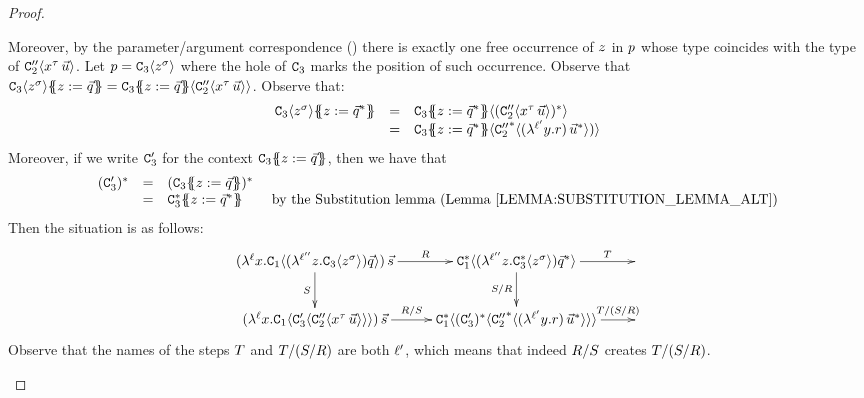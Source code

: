 \begin{proof}
\begin{enumerate}
\begin{enumerate}
\begin{enumerate}
\begin{enumerate}
        Moreover, by the parameter/argument correspondence ()
        there is exactly one free occurrence of $z$ in $p$ whose type coincides with
        the type of $\mathtt{C}''_2\langle x^\tau\,\vec{u}\rangle$.
        Let $p = \mathtt{C}_3\langle z^{\sigma}\rangle$ where the hole of $\mathtt{C}_3$ marks the position
        of such occurrence.
        Observe that
        $\con_3\of{\varthree^{\typtwo}}\sub{\varthree}{\ls{\tmsix}} = \con_3\sub{\varthree}{\ls{\tmsix}}\of{\con''_2\of{\var^\typ\,\ls{\tmthree}}}$.
        Observe that:
        \[
          \begin{array}{rcl}
          \con_3\of{\varthree^{\typtwo}}\sub{\varthree}{\ls{\tmsix}^*}
          & = & \con_3\sub{\varthree}{\ls{\tmsix}^*}\of{(\con''_2\of{\var^\typ\,\ls{\tmthree}})^*} \\
          & = & \con_3\sub{\varthree}{\ls{\tmsix}^*}\of{{\con''_2}^*\of{(\lamp{\labtwo}{\vartwo}{\tmfour})\,\ls{\tmthree}^*})}
          \end{array}
        \]
        Moreover, if we write $\mathtt{C}'_3$ for the context $\mathtt{C}_3\{\!\!\{z := \vec{q}\}\!\!\}$,
        then we have that
        \[
          \begin{array}{rcll}
          (\con'_3)^*
          & = & (\con_3\sub{\varthree}{\ls{\tmsix}})^* \\
          & = & \con_3^*\sub{\varthree}{\ls{\tmsix}^*} & \text{ by the Substitution lemma~(\rlem{substitution_lemma_alt})}
          \end{array}
        \]
        Then the situation is as follows:
        \[
          \xymatrix{
            (\lamp{\lab}{\var}{\con_1\of{ (\lamp{\labthree}{\varthree}{\con_3\of{\varthree^\typtwo}})\ls{\tmsix} }})\,\ls{\tmtwo}
            \ar[r]^-{\redex}
            \ar[d]_-{\redextwo}
          &
            \con_1^*\of{ (\lamp{\labthree}{\varthree}{\con_3^*\of{\varthree^\typtwo}})\ls{\tmsix}^* }
            \ar[d]_-{\redextwo/\redex}
            \ar[r]^-{\redexthree}
          &
          \\
            (\lamp{\lab}{\var}{\con_1\of{ \con'_3\of{ \con''_2\of{\var^\typ\,\ls{\tmthree}} } }})\,\ls{\tmtwo}
            \ar[r]^-{\redex/\redextwo}
          &
            \con_1^*\of{ (\con'_3)^*\of{ {\con''_2}^*\of{(\lamp{\labtwo}{\vartwo}{\tmfour})\,\ls{\tmthree}^*} } }
            \ar[r]^-{\redexthree/(\redextwo/\redex)}
          &
          }
        \]
        Observe that the names of the steps $T$ and $T/(S/R)$ are both $\ell'$,
        which means that indeed $R/S$ creates $T/(S/R)$.

\end{enumerate}
\end{enumerate}
\end{enumerate}
\end{enumerate}
\end{proof}
